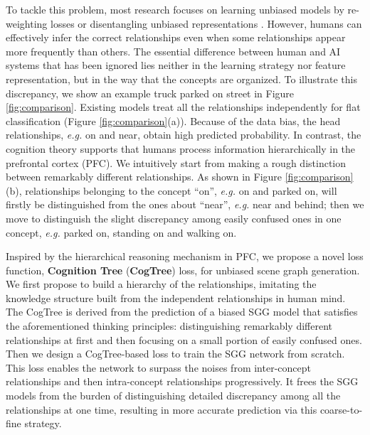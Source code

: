 \documentclass{article}
\begin{document}
To tackle this problem, most research focuses on learning unbiased models by re-weighting losses \cite{zareian2020bridging} or disentangling unbiased representations \cite{Tang2020Unbiased}. However, humans can effectively infer the correct relationships even when some relationships appear more frequently than others. The essential difference between human and AI systems that has been ignored lies neither in the learning strategy nor feature representation, but in the way that the concepts are organized. To illustrate this discrepancy, we show an example {\ttfamily truck parked on street} in Figure \ref{fig:comparison}. Existing models treat all the relationships independently for flat classification (Figure \ref{fig:comparison}(a)). Because of the data bias, the head relationships, \textit{e.g.} {\ttfamily on} and {\ttfamily near}, obtain high predicted probability. In contrast, the cognition theory \cite{Sarafyazd2019Hierarchical} supports that humans process information hierarchically in the  prefrontal  cortex  (PFC). We intuitively start from making a rough distinction between remarkably different relationships. As shown in Figure \ref{fig:comparison}(b), relationships belonging to the concept  ``on'',
\textit{e.g.} {\ttfamily on} and {\ttfamily parked on}, will firstly be distinguished from the ones about ``near'', \textit{e.g.} {\ttfamily near} and {\ttfamily behind}; then we move to distinguish the slight discrepancy among easily confused ones in one concept, \textit{e.g.} {\ttfamily parked on}, {\ttfamily standing on} and {\ttfamily walking on}.

Inspired by the hierarchical reasoning mechanism in PFC, we propose a  novel loss function, \textbf{Cognition Tree} (\textbf{CogTree}) loss, for unbiased scene graph generation. We first propose to build a hierarchy of the relationships, imitating the knowledge structure built from the independent relationships in human mind. The CogTree is derived from the prediction of a biased SGG model that satisfies the aforementioned  thinking principles: distinguishing remarkably different relationships at first and then 
focusing on a small portion of easily confused ones. Then we design a CogTree-based loss to train the SGG network from scratch. This loss enables the network to surpass the noises from inter-concept relationships and then intra-concept relationships progressively. It frees the SGG models from the burden of distinguishing detailed discrepancy among all the relationships at one time, resulting in 
more accurate prediction via this coarse-to-fine strategy.  
\end{document}
